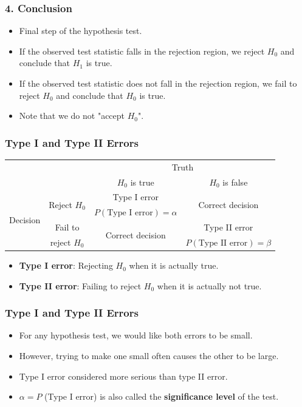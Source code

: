 \documentclass[12pt]{beamer}
\begin{document}
\begin{frame}
	\frametitle{4. Conclusion}
	
	\begin{itemize}[label={\color{blue}$\blacktriangleright$}]
		\item Final step of the hypothesis test.
		
		\item If the observed test statistic falls in the rejection region, we reject $H_0$ and conclude that $H_1$ is true.
		
		\item If the observed test statistic does not fall in the rejection region, we fail to reject $H_0$ and conclude that $H_0$ is true.
		\item Note that we do not "accept $H_0$".
	\end{itemize}
	
\end{frame}
\begin{frame}
	\frametitle{Type I and Type II Errors}
	
	\begin{table}
		\centering
		\begin{tabular}{cccc}
			\toprule
			&& \multicolumn{2}{c}{Truth} \\
			\cline{3-4}
			&& $H_0$ is true & $H_0$ is false \\
			\midrule
			\multirow{4}{*}{Decision} &\multirow{2}{*}{Reject $H_0$ }  & Type I error &\multirow{2}{*}{Correct decision}  \\
			&& $P(\text{Type I error}) = \alpha$ & \\
			\cline{2-4}
			&Fail to &\multirow{2}{*}{Correct decision}  & Type II error \\
		&reject $H_0$ & &$P(\text{Type II error}) = \beta$ \\
			\bottomrule
		\end{tabular}
	\end{table}
	

	\begin{itemize}[label={\color{blue}$\blacktriangleright$}]
		\item \textbf{Type I error}: Rejecting $H_0$ when it is actually true.
		\item \textbf{Type II error}: Failing to reject $H_0$ when it is actually not true.
	\end{itemize}
	
\end{frame}
\begin{frame}
	\frametitle{Type I and Type II Errors}
	\begin{itemize}[label={\color{blue}$\blacktriangleright$}]
		\item For any hypothesis test, we would like both errors to be small.
		\item However, trying to make one small often causes the other to be large.
		\item Type I error considered more serious than type II error.
		\item $\alpha=P$ (Type I error) is also called the {\bf significance level} of the test.
	\end{itemize}
	
\end{frame}
\end{document}
